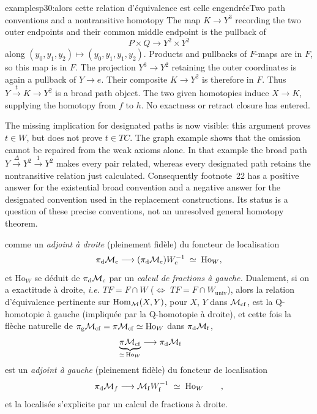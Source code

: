 \begin{dcomment}{examples}{p30:alors cette relation d'équivalence est celle engendrée}{Two path conventions and a nontransitive homotopy}
The map $K\to Y^3$ recording the two outer endpoints and their common middle endpoint is the pullback of
\[
 P\times Q\longrightarrow Y^2\times Y^2
\]
along $(y_0,y_1,y_2)\mapsto(y_0,y_1,y_1,y_2)$. Products and pullbacks of $F$-maps are in $F$, so this map is in $F$. The projection $Y^3\to Y^2$ retaining the outer coordinates is again a pullback of $Y\to e$. Their composite $K\to Y^2$ is therefore in $F$. Thus $Y\xrightarrow{t}K\to Y^2$ is a broad path object. The two given homotopies induce $X\to K$, supplying the homotopy from $f$ to $h$. No exactness or retract closure has entered.

The missing implication for designated paths is now visible: this argument proves $t\in W$, but does not prove $t\in TC$. The graph example shows that the omission cannot be repaired from the weak axioms alone. In that example the broad path $Y\xrightarrow{\Delta}Y^2\xrightarrow{1}Y^2$ makes every pair related, whereas every designated path retains the nontransitive relation just calculated. Consequently footnote~22 has a positive answer for the existential broad convention and a negative answer for the designated convention used in the replacement constructions. Its status is a question of these precise conventions, not an unresolved general homotopy theorem.
\end{dcomment}


\setcounter{footnote}{23}

comme un \textit{adjoint à droite} (pleinement fidèle) du foncteur de localisation
\[
\pi_{\mathrm{d}}\mathcal{M}_{\mathrm{c}} \longrightarrow (\pi_{\mathrm{d}}\mathcal{M}_{\mathrm{c}})W_{\mathrm{c}}^{-1} \;\simeq\; \mathrm{Ho}_W,
\]
et $\mathrm{Ho}_W$ se déduit de $\pi_{\mathrm{d}}\mathcal{M}_{\mathrm{c}}$ par un \textit{calcul de fractions à gauche.} Dualement, si on a exactitude à droite, \textit{i.e.} $TF = F\cap W$ ($\Longleftrightarrow$ $TF = F\cap W_{\mathrm{univ}}$), alors la relation d'équivalence pertinente sur $\mathrm{Hom}_{\mathcal{M}}(X,Y)$, pour $X$, $Y$ dans $\mathcal{M}_{\mathrm{cf}}$, est la Q-homotopie à gauche (impliquée par la Q-homotopie à droite), et cette fois la flèche naturelle de $\pi_{\mathrm{g}}\mathcal{M}_{\mathrm{cf}} = \pi\mathcal{M}_{\mathrm{cf}} \simeq \mathrm{Ho}_W$ dans $\pi_{\mathrm{d}}\mathcal{M}_{\mathrm{f}}$,
\[
\underbrace{\pi\mathcal{M}_{\mathrm{cf}}}_{\simeq\,\mathrm{Ho}_W} \longrightarrow \pi_{\mathrm{d}}\mathcal{M}_{\mathrm{f}} \qquad
\]
est un \textit{adjoint à gauche} (pleinement fidèle) du foncteur de localisation
\[
\pi_{\mathrm{d}}\cM_f \longrightarrow \cM_{\mathrm{f}}W_{\mathrm{f}}^{-1} \;\simeq\; \mathrm{Ho}_W \qquad, %
\]
et la localisée s'explicite par un calcul de fractions à droite.

